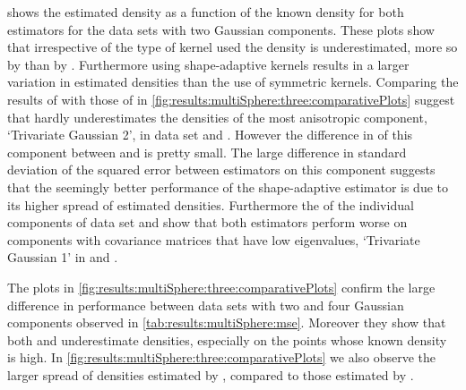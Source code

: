 	\begin{figure*}
		\centering
		
		\caption{Plots of the true versus estimated density of data sets \ferdosiTwo and \baakmanTwo for the shape-adaptive and the symmetric Modified Breiman Estimator.}
		\label{fig:results:multiSphere:two:comparativePlots}
	\end{figure*}
	 shows the estimated density as a function of the known density for both estimators for the data sets with two Gaussian components. These plots show that irrespective of the type of kernel used the density is underestimated, more so by \mbe than by \sambe. Furthermore using shape-adaptive kernels results in a larger variation in estimated densities than the use of symmetric kernels. 
		Comparing the results of \sambe with those of \mbe in \cref{fig:results:multiSphere:three:comparativePlots} suggest that \sambe hardly underestimates the densities of the most anisotropic component, \ie `Trivariate Gaussian 2', in data set \ferdosiTwo and \baakmanTwo. However the difference in \mse of this component between \mbe and \sambe is pretty small. The large difference in standard deviation of the squared error between estimators on this component suggests that the seemingly better performance of the shape-adaptive estimator is due to its higher spread of estimated densities.
		Furthermore the \mses of the individual components of data set \ferdosiTwo and \baakmanThree show that both estimators perform worse on components with covariance matrices that have low eigenvalues, \eg `Trivariate Gaussian 1' in \ferdosiTwo and \baakmanThree.
	\begin{figure*}
		\centering
		
		\caption{The estimated density as a function of the true density for data set \ferdosiThree and \baakmanThree, for both \mbe and \sambe.}
		\label{fig:results:multiSphere:three:comparativePlots}
	\end{figure*}
	The plots in \cref{fig:results:multiSphere:three:comparativePlots} confirm the large difference in performance between data sets with two and four Gaussian components observed in \cref{tab:results:multiSphere:mse}. Moreover they show that both \mbe and \sambe underestimate densities, especially on the points whose known density is high. In \cref{fig:results:multiSphere:three:comparativePlots} we also observe the larger spread of densities estimated by \sambe, compared to those estimated by \mbe.


